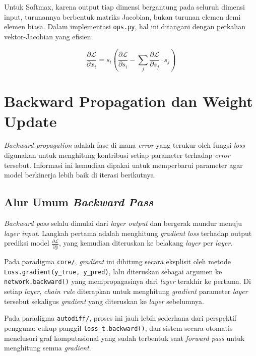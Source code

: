 Untuk Softmax, karena output tiap dimensi bergantung pada seluruh dimensi input, turunannya berbentuk matriks Jacobian, bukan turunan elemen demi elemen biasa. Dalam implementasi \texttt{ops.py}, hal ini ditangani dengan perkalian vektor-Jacobian yang efisien:

\begin{equation}
    \frac{\partial \mathcal{L}}{\partial x_i} = s_i \left( \frac{\partial \mathcal{L}}{\partial s_i} - \sum_j \frac{\partial \mathcal{L}}{\partial s_j} \cdot s_j \right)
\end{equation}

\section{Backward Propagation dan Weight Update}

\textit{Backward propagation} adalah fase di mana \textit{error} yang terukur oleh fungsi \textit{loss} digunakan untuk menghitung kontribusi setiap parameter terhadap \textit{error} tersebut. Informasi ini kemudian dipakai untuk memperbarui parameter agar model berkinerja lebih baik di iterasi berikutnya.

\subsection{Alur Umum \textit{Backward Pass}}

\textit{Backward pass} selalu dimulai dari \textit{layer output} dan bergerak mundur menuju \textit{layer input}. Langkah pertama adalah menghitung \textit{gradient} \textit{loss} terhadap output prediksi model $\frac{\partial \mathcal{L}}{\partial \hat{y}}$, yang kemudian diteruskan ke belakang \textit{layer} per \textit{layer}.

Pada paradigma \texttt{core/}, \textit{gradient} ini dihitung secara eksplisit oleh metode \texttt{Loss.gradient(y\_true, y\_pred)}, lalu diteruskan sebagai argumen ke \texttt{network.backward()} yang mempropagasinya dari \textit{layer} terakhir ke pertama. Di setiap \textit{layer}, \textit{chain rule} diterapkan untuk menghitung \textit{gradient} parameter \textit{layer} tersebut sekaligus \textit{gradient} yang diteruskan ke \textit{layer} sebelumnya.

Pada paradigma \texttt{autodiff/}, proses ini jauh lebih sederhana dari perspektif pengguna: cukup panggil \texttt{loss\_t.backward()}, dan sistem secara otomatis menelusuri graf komputasional yang sudah terbentuk saat \textit{forward pass} untuk menghitung semua \textit{gradient}.

